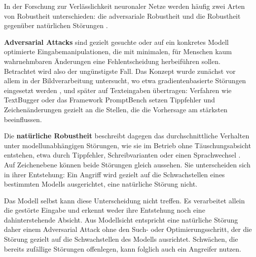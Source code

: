 \documentclass[a4paper,titlepage]{article}
\numberwithin{equation}{section} %
\begin{document}
In der Forschung zur Verlässlichkeit neuronaler Netze werden häufig zwei Arten von Robustheit unterschieden: die adversariale Robustheit und die Robustheit gegenüber natürlichen Störungen \citep{hendrycks_benchmarking_2019, wang_measure_2022}.

\textbf{Adversarial Attacks} sind gezielt gesuchte oder auf ein konkretes Modell optimierte Eingabemanipulationen, die mit minimalen, für Menschen kaum wahrnehmbaren Änderungen eine Fehlentscheidung herbeiführen sollen. Betrachtet wird also der ungünstigste Fall. Das Konzept wurde zunächst vor allem in der Bildverarbeitung untersucht, wo etwa gradientenbasierte Störungen eingesetzt werden \citep{goodfellow_explaining_2014}, und später auf Texteingaben übertragen: Verfahren wie TextBugger \citep{li_textbugger_2019} oder das Framework PromptBench \citep{zhu_promptrobust_2024} setzen Tippfehler und Zeichenänderungen gezielt an die Stellen, die die Vorhersage am stärksten beeinflussen.

Die \textbf{natürliche Robustheit} beschreibt dagegen das durchschnittliche Verhalten unter modellunabhängigen Störungen, wie sie im Betrieb ohne Täuschungsabsicht entstehen, etwa durch Tippfehler, Schreibvarianten oder einen Sprachwechsel \citep{belinkov_synthetic_2018, wang_measure_2022}. Auf Zeichenebene können beide Störungen gleich aussehen. Sie unterscheiden sich in ihrer Entstehung: Ein Angriff wird gezielt auf die Schwachstellen eines bestimmten Modells ausgerichtet, eine natürliche Störung nicht.

Das Modell selbst kann diese Unterscheidung nicht treffen. Es verarbeitet allein die gestörte Eingabe und erkennt weder ihre Entstehung noch eine dahinterstehende Absicht. Aus Modellsicht entspricht eine natürliche Störung daher einem Adversarial Attack ohne den Such- oder Optimierungsschritt, der die Störung gezielt auf die Schwachstellen des Modells ausrichtet. Schwächen, die bereits zufällige Störungen offenlegen, kann folglich auch ein Angreifer nutzen.
\end{document}
